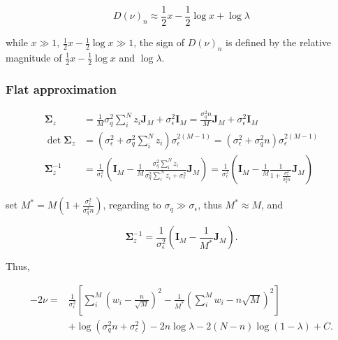 \begin{equation}
    D(\nu)_n \approx \frac{1}{2}x - \frac{1}{2}\log x + \log\lambda
\end{equation}

while $x \gg 1$, $\frac{1}{2}x - \frac{1}{2}\log x \gg 1$, the sign of $D(\nu)_n$ is defined by the relative magnitude of $\frac{1}{2}x - \frac{1}{2}\log x$ and $\log\lambda$. 

\subsubsection{Flat approximation}

\begin{equation}
\begin{aligned}
    \bm{\Sigma}_z &= \frac{1}{M}\sigma_q^2\sum_i^N z_i\bm{J}_M + \sigma_\epsilon^2\bm{I}_M = \frac{\sigma_q^2n}{M}\bm{J}_M+\sigma_\epsilon^2\bm{I}_M \\
    \det\bm{\Sigma}_z &= (\sigma_\epsilon^2 + \sigma_q^2\sum_i^N z_i)\sigma_\epsilon^{2(M-1)} = (\sigma_\epsilon^2 + \sigma_q^2n)\sigma_\epsilon^{2(M-1)} \\
    \bm{\Sigma}_z^{-1} &= \frac{1}{\sigma_\epsilon^2}\left(\bm{I}_M - \frac{1}{M}\frac{\sigma_q^2\sum_i^N z_i}{\sigma_q^2\sum_i^N z_i+\sigma_\epsilon^2}\bm{J}_M\right) = \frac{1}{\sigma_\epsilon^2}\left(\bm{I}_M - \frac{1}{M}\frac{1}{1+\frac{\sigma_\epsilon^2}{\sigma_q^2n}}\bm{J}_M\right)
\end{aligned}
\end{equation}

set $M^\ast = M(1+\frac{\sigma_\epsilon^2}{\sigma_q^2n})$, regarding to $\sigma_q\gg\sigma_\epsilon$, thus $M^\ast\approx M$, and

\begin{equation}
    \bm{\Sigma}_z^{-1} = \frac{1}{\sigma_\epsilon^2}\left(\bm{I}_M - \frac{1}{M^\ast}\bm{J}_M\right).
\end{equation}

Thus, 

\begin{equation}
\begin{aligned}
    -2\nu =& \frac{1}{\sigma_\epsilon^2}\left[\sum_i^M\left(w_i-\frac{n}{\sqrt{M}}\right)^2-\frac{1}{M^\ast}\left(\sum_i^M w_i-n\sqrt{M}\right)^2\right] \\
    &+ \log(\sigma_q^2n+\sigma_\epsilon^2) - 2n\log\lambda - 2(N-n)\log(1-\lambda) + C.
\end{aligned}
\end{equation}

